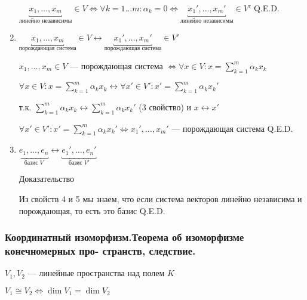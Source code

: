 \begin{enumerate}
          \(\underbracket{x_1, \ldots
              , x_m}_{\text{линейно независимы}} \in V \Leftrightarrow \forall k = 1 \ldots m: \alpha_k = 0 \Leftrightarrow \underbracket{x_1', \ldots
              , x_m'}_{\text{линейно независимы}} \in V'\)
          \hfill Q.E.D.

    \item \(\underbracket{x_1, \ldots
              , x_m}_{\text{порождающая система}} \in V \longleftrightarrow \underbracket{x_1', \ldots, x_m'}_{\text{порождающая система}} \in V'\)

          \(x_1, \ldots, x_m \in V\) --- порождающая система \(\Leftrightarrow \forall x \in V: x = \sum\limits_{k = 1}^{m} \alpha_k x_k\)

          \(\forall x \in V: x = \sum\limits_{k = 1}^{m} \alpha_k x_k \longleftrightarrow \forall x' \in V': x' = \sum\limits_{k = 1}^{m} \alpha_k x_k'\)

          т.к. \(\sum\limits_{k = 1}^{m} \alpha_k x_k \longleftrightarrow \sum\limits_{k = 1}^{m} \alpha_k x_k'\) (3 свойство) и \(x \longleftrightarrow x'\)

          \(\forall x' \in V': x' = \sum\limits_{k = 1}^{m} \alpha_k x_k' \Leftrightarrow x_1', \ldots, x_m'\) --- порождающая система
          \hfill Q.E.D.

    \item \(\underbracket{e_1, \ldots, e_n}_{\text{базис } V} \longleftrightarrow \underbracket{e_1', \ldots, e_n'}_{\text{базис } V'}\)

          Доказательство

          Из свойств 4 и 5 мы знаем, что если система векторов линейно независима и порождающая, то есть это базис
          \hfill Q.E.D.
\end{enumerate}


\subsubsection{Координатный изоморфизм.Теорема об изоморфизме конечномерных про-
странств, следствие.}


\(V_1, V_2\) --- линейные пространства над полем \(K\)

\(V_1 \cong V_2 \Leftrightarrow \dim V_1 = \dim V_2\)

